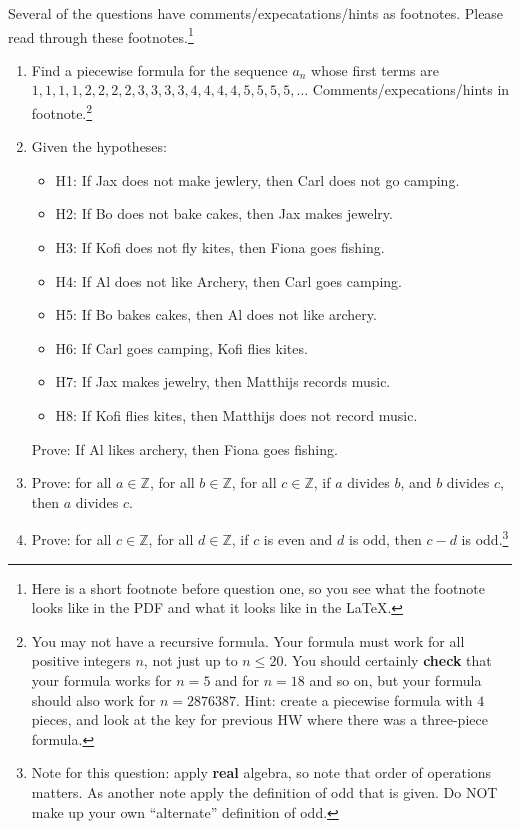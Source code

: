 \documentclass{article}
\begin{document}
\noindent Several of the questions have comments/expecatations/hints as footnotes. Please read through these footnotes.\footnote{Here is a short footnote before question one, so you see what the footnote looks like in the PDF and what it looks like in the LaTeX.}
\begin{enumerate}

\item Find a piecewise formula for the sequence $a_n$ whose first terms are\vskip1pt $1,1,1,1,2,2,2,2,3,3,3,3,4,4,4,4,5,5,5,5,\dots$\vskip1pt  Comments/expecations/hints in footnote.\footnote{You may not have a recursive formula. Your formula must work for all positive integers $n$, not just up to $n \leq 20$. You should certainly {\bf check} that your formula works for $n=5$ and for $n=18$ and so on, but your formula should also work for $n=2876387$. Hint: create a piecewise formula with $4$ pieces, and look at the key for previous HW where there was a three-piece formula.}

\item Given the hypotheses:
\begin{itemize}
\item H1: If Jax does not make jewlery, then Carl does not go camping.
\item H2: If Bo does not bake cakes, then Jax makes jewelry.
\item H3: If Kofi does not fly kites, then Fiona goes fishing.
\item H4: If Al does not like Archery, then Carl goes camping.
\item H5: If Bo bakes cakes, then Al does not like archery.
\item H6: If Carl goes camping, Kofi flies kites.
\item H7: If Jax makes jewelry, then Matthijs records music.
\item H8: If Kofi flies kites, then Matthijs does not record music.
\end{itemize}
Prove: If Al likes archery, then Fiona goes fishing.

\item Prove: for all $a \in \mathbb{Z}$, for all $b \in \mathbb{Z}$, for all $c \in \mathbb{Z}$, if $a$ divides $b$, and $b$ divides $c$, then $a$ divides $c$.

\item Prove: for all $c \in \mathbb{Z}$, for all $d \in \mathbb{Z}$, if $c$ is even and $d$ is odd, then $c-d$ is odd.\footnote{Note for this question: apply {\bf real} algebra, so note that order of operations matters. As another note apply the definition of odd that is given. Do NOT make up your own ``alternate'' definition of odd.}


\end{enumerate}
\end{document}
